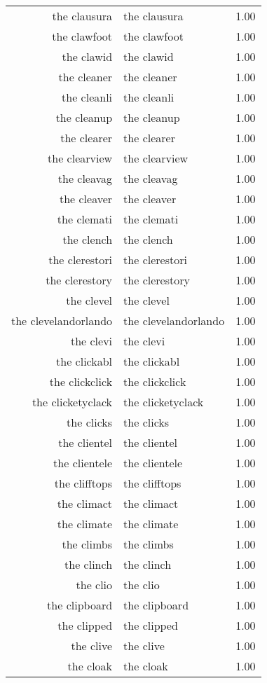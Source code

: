 \begin{table}[ht]
\begin{tabular}{rlr}
  the clausura & the clausura & 1.00 \\ 
  the clawfoot & the clawfoot & 1.00 \\ 
  the clawid & the clawid & 1.00 \\ 
  the cleaner & the cleaner & 1.00 \\ 
  the cleanli & the cleanli & 1.00 \\ 
  the cleanup & the cleanup & 1.00 \\ 
  the clearer & the clearer & 1.00 \\ 
  the clearview & the clearview & 1.00 \\ 
  the cleavag & the cleavag & 1.00 \\ 
  the cleaver & the cleaver & 1.00 \\ 
  the clemati & the clemati & 1.00 \\ 
  the clench & the clench & 1.00 \\ 
  the clerestori & the clerestori & 1.00 \\ 
  the clerestory & the clerestory & 1.00 \\ 
  the clevel & the clevel & 1.00 \\ 
  the clevelandorlando & the clevelandorlando & 1.00 \\ 
  the clevi & the clevi & 1.00 \\ 
  the clickabl & the clickabl & 1.00 \\ 
  the clickclick & the clickclick & 1.00 \\ 
  the clicketyclack & the clicketyclack & 1.00 \\ 
  the clicks & the clicks & 1.00 \\ 
  the clientel & the clientel & 1.00 \\ 
  the clientele & the clientele & 1.00 \\ 
  the clifftops & the clifftops & 1.00 \\ 
  the climact & the climact & 1.00 \\ 
  the climate & the climate & 1.00 \\ 
  the climbs & the climbs & 1.00 \\ 
  the clinch & the clinch & 1.00 \\ 
  the clio & the clio & 1.00 \\ 
  the clipboard & the clipboard & 1.00 \\ 
  the clipped & the clipped & 1.00 \\ 
  the clive & the clive & 1.00 \\ 
  the cloak & the cloak & 1.00 \\ 

\end{tabular}
\end{table}
